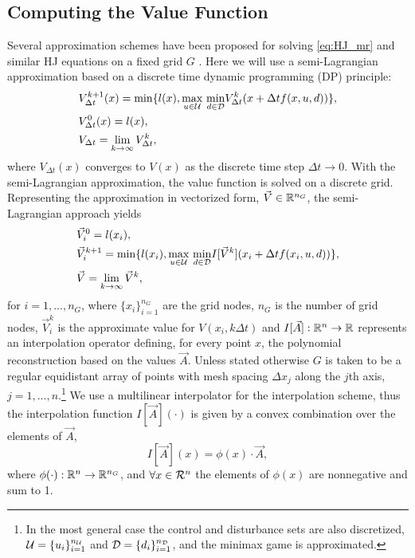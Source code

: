 \subsection{Computing the Value Function}
Several approximation schemes have been proposed for solving \eqref{eq:HJ_mr} and similar HJ equations on a fixed grid $G$ \cite{Bardi1999, Falcone1994, Mitchell2005,Osher2003,Sethian1996}. Here we will use a semi-Lagrangian approximation based on a discrete time dynamic programming (DP) principle:
%
\begin{subequations}
\begin{align}
&V_{\Delta t}^{k+1}(x) = \min\{l(x),  \underset{u\in\mathcal{U}}{\max}\text{ }\underset{ d\in\mathcal{D}}{\min} V^{k}_{\Delta t}(x+\Delta t f(x,u,d))\},\\
&V_{\Delta t}^{0}(x) = l(x),\\
&V_{\Delta t} = \lim_{k\rightarrow \infty} V^{k}_{\Delta t},
\end{align}
\end{subequations}%
\noindent where $V_{\Delta t}(x)$ converges to $V(x)$ as the discrete time step $\Delta t \rightarrow 0$. With the semi-Lagrangian approximation, the value function is solved on a discrete grid. Representing the approximation in vectorized form, $\vec{V} \in \mathbb{R}^{n_G}$, the semi-Lagrangian approach yields \ 
\begin{subequations} \label{eq:dp_min_dist}
\begin{align}
&\vec{V}_{i}^{0} = l(x_i),\\
&\vec{V}_{i}^{k+1} = \min\{l(x_i),  \underset{u\in\mathcal{U}}{\max}\text{ }\underset{ d\in\mathcal{D}}{\min} I[\vec{V}^{k}](x_i+\Delta t f(x_i,u,d)) \label{eq:dp_min_dist_b}\},\\
&\vec{V} = \lim_{k\rightarrow \infty} \vec{V}^{k},
\end{align}
\end{subequations}%
\noindent for  $i=1, ..., n_G$, where $\{x_i\}_{i=1}^{n_G}$ are the grid nodes, $n_G$ is the number of grid nodes, $\vec{V}_i^k$ is the approximate value for $V(x_i, k \Delta t)$ and ${I[\vec{A}]:\mathbb{R}^n \rightarrow \mathbb{R}}$ represents an interpolation operator defining, for every point $x$, the polynomial reconstruction based on the values $\vec{A}$. Unless stated otherwise $G$ is taken to be a regular equidistant array of points with mesh spacing $\Delta x_j$ along the $j$th axis, $j=1,...,n$.\footnote{In the most general case the control and disturbance sets are also discretized, $\mathcal{U}=\{u_i\}_{i=1}^{n_{\mathcal{U}}}$ and $\mathcal{D}=\{d_i\}_{i=1}^{n_{\mathcal{D}}}$, and the minimax game is approximated.} We use a multilinear interpolator for the interpolation scheme, thus the interpolation function $I[\vec{A}](\cdot)$ is given by a convex combination over the elements of $\vec{A}$,
\begin{equation}
I[\vec{A}](x)= \phi(x)\cdot \vec{A},
\end{equation}%
\noindent where ${\phi(\cdot): \mathbb{R}^n \rightarrow \mathbb{R}^{n_G}}$, and $\forall x \in \mathcal{R}^n$ the elements of $\phi(x)$ are nonnegative and sum to 1. 

